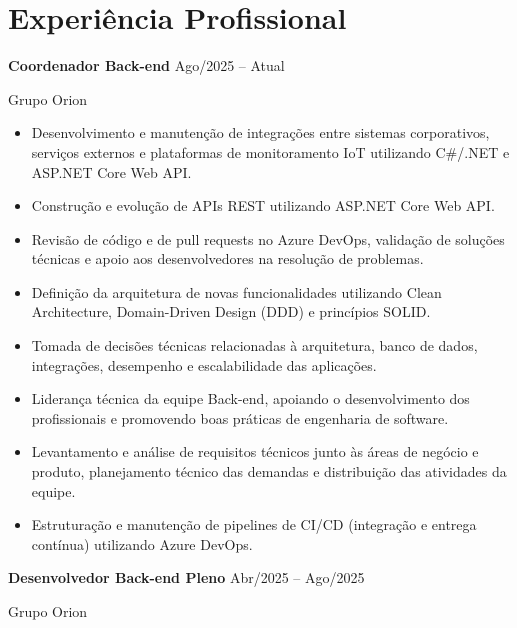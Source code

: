 \documentclass[11pt,a4paper]{article}
\begin{document}
\section{Experiência Profissional}

\textbf{Coordenador Back-end}
\hfill Ago/2025 -- Atual

Grupo Orion

\begin{itemize}[leftmargin=*,noitemsep,topsep=2pt]

\item Desenvolvimento e manutenção de integrações entre sistemas corporativos, serviços externos e plataformas de monitoramento IoT utilizando C\#/.NET e ASP.NET Core Web API.

\item Construção e evolução de APIs REST utilizando ASP.NET Core Web API.

\item Revisão de código e de pull requests no Azure DevOps, validação de soluções técnicas e apoio aos desenvolvedores na resolução de problemas.

\item Definição da arquitetura de novas funcionalidades utilizando Clean Architecture, Domain-Driven Design (DDD) e princípios SOLID.

\item Tomada de decisões técnicas relacionadas à arquitetura, banco de dados, integrações, desempenho e escalabilidade das aplicações.

\item Liderança técnica da equipe Back-end, apoiando o desenvolvimento dos profissionais e promovendo boas práticas de engenharia de software.

\item Levantamento e análise de requisitos técnicos junto às áreas de negócio e produto, planejamento técnico das demandas e distribuição das atividades da equipe.

\item Estruturação e manutenção de pipelines de CI/CD (integração e entrega contínua) utilizando Azure DevOps.

\end{itemize}

\vspace{0.2cm}

\textbf{Desenvolvedor Back-end Pleno}
\hfill Abr/2025 -- Ago/2025

Grupo Orion
\end{document}

